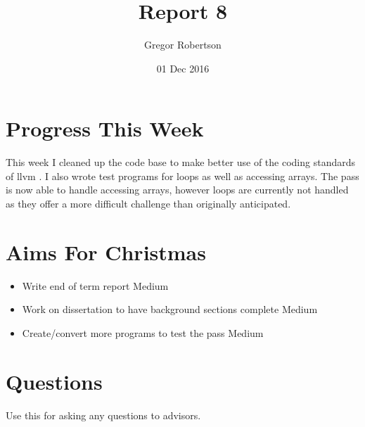\documentclass{article}
\title{Report 8}
\author{Gregor Robertson}
\date{01 Dec 2016}
\begin{document}
 
\maketitle
 
\section*{Progress This Week}
This week I cleaned up the code base to make better use of the coding standards of llvm \cite{standards}. I also wrote test programs for loops as well as accessing arrays. The pass is now able to handle accessing arrays, however loops are currently not handled as they offer a more difficult challenge than originally anticipated. 

\section*{Aims For Christmas}
\begin{itemize}
	\item Write end of term report \colorbox{BurntOrange}{\color{Black}Medium}
	\item Work on dissertation to have background sections complete \colorbox{BurntOrange}{\color{Black}Medium}
	\item Create/convert more programs to test the pass \colorbox{BurntOrange}{\color{Black}Medium}
\end{itemize}

\section*{Questions}
Use this for asking any questions to advisors.

\medskip
 
\printbibliography
\end{document}
